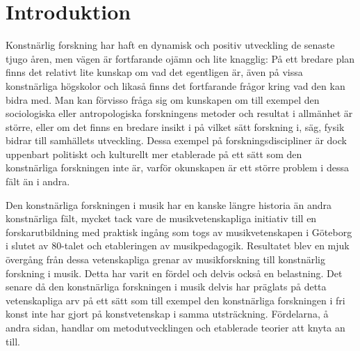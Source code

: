 \documentclass[11pt]{article}
\author{Henrik Frisk}
\date{\today}
\title{}
\begin{document}
\tableofcontents

\maketitle
\section{Introduktion}
\label{sec:orgdd1c696}
Konstnärlig forskning har haft en dynamisk och positiv utveckling de
senaste tjugo åren, men vägen är fortfarande ojämn och lite knagglig: På
ett bredare plan finns det relativt lite kunskap om vad det egentligen
är, även på vissa konstnärliga högskolor och likaså finns det
fortfarande frågor kring vad den kan bidra med. Man kan förvisso fråga
sig om kunskapen om till exempel den sociologiska eller antropologiska
forskningens metoder och resultat i allmänhet är större, eller om det
finns en bredare insikt i på vilket sätt forskning i, säg, fysik bidrar
till samhällets utveckling. Dessa exempel på forskningsdiscipliner är
dock uppenbart politiskt och kulturellt mer etablerade på ett sätt som
den konstnärliga forskningen inte är, varför okunskapen är ett större
problem i dessa fält än i andra.

Den konstnärliga forskningen i musik har en kanske längre historia än
andra konstnärliga fält, mycket tack vare de musikvetenskapliga
initiativ till en forskarutbildning med praktisk ingång som togs av
musikvetenskapen i Göteborg i slutet av 80-talet och etableringen av
musikpedagogik. Resultatet blev en mjuk övergång från dessa
vetenskapliga grenar av musikforskning till konstnärlig forskning i
musik. Detta har varit en fördel och delvis också en belastning. Det
senare då den konstnärliga forskningen i musik delvis har präglats på
detta vetenskapliga arv på ett sätt som till exempel den konstnärliga
forskningen i fri konst inte har gjort på konstvetenskap i samma
utsträckning. Fördelarna, å andra sidan, handlar om metodutvecklingen
och etablerade teorier att knyta an till.
\end{document}
